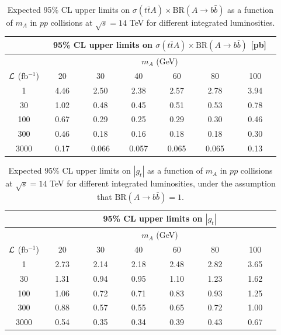 \documentclass[preprintnumbers,superscriptaddress,nofootinbib,aps,prd,floatfix]{revtex4}
\newcommand{\ttbar}{\ensuremath{t\bar{t}}}
\newcommand{\BR} {\ensuremath{\mathrm{BR}}}
\begin{document}
\begin{table}[h] 
\begin{center} 
\begin{tabular}{ccccccc} 
\hline\hline
 & \multicolumn{6}{c}{95\% CL upper limits on $\sigma(\ttbar A) \times \BR(A\to b\bar{b})$ [pb]} \\
\hline
  & \multicolumn{6}{c}{$m_A$ (GeV)} \\
  \cline{2-7} 
${\cal L}$ (fb$^{-1}$) & $\quad$ 20 $\quad$ & $\quad$ 30 $\quad$ & $\quad$ 40 $\quad$ & $\quad$ 60 $\quad$ & $\quad$ 80 $\quad$ & $\quad$ 100 $\quad$ \\
\hline
1 & 4.46 & 2.50 & 2.38 & 2.57 & 2.78 & 3.94 \\
30 & 1.02 & 0.48 & 0.45 & 0.51 & 0.53 & 0.78  \\
100 & 0.67 & 0.29 & 0.25 & 0.29 & 0.30 & 0.46 \\
300 & 0.46 & 0.18 & 0.16 & 0.18 & 0.18 & 0.30 \\
3000 & 0.17 & 0.066 & 0.057 & 0.065 & 0.065 & 0.13 \\
\hline\hline
\end{tabular} 
\caption{\small {Expected 95\% CL upper limits on $\sigma(\ttbar A) \times \BR(A\to b\bar{b})$ as a function of $m_A$ 
in $pp$ collisions at $\sqrt{s}=14$ TeV for different integrated luminosities.}}
\label{tab:sigma_95CL} 
\end{center} 
\end{table} 

\begin{table}[h!] 
\begin{center} 
\begin{tabular}{ccccccc} 
\hline\hline
 & \multicolumn{6}{c}{95\% CL upper limits on $|g_t|$} \\
\hline
  & \multicolumn{6}{c}{$m_A$ (GeV)} \\
  \cline{2-7} 
${\cal L}$ (fb$^{-1}$) & $\quad$ 20 $\quad$ & $\quad$ 30 $\quad$ & $\quad$ 40 $\quad$ & $\quad$ 60 $\quad$ & $\quad$ 80 $\quad$ & $\quad$ 100 $\quad$ \\
\hline
1 & 2.73  & 2.14 & 2.18 & 2.48 & 2.82 & 3.65 \\
30 & 1.31  & 0.94 & 0.95 & 1.10 & 1.23 & 1.62 \\
100 & 1.06 & 0.72 & 0.71 & 0.83 & 0.93 & 1.25 \\
300 & 0.88 & 0.57 & 0.55 & 0.65 & 0.72 & 1.00 \\
3000 & 0.54 & 0.35 & 0.34 & 0.39 & 0.43 & 0.67 \\
\hline\hline
\end{tabular} 
\caption{\small {Expected 95\% CL upper limits on $|g_t|$ as a function of $m_A$ 
in $pp$ collisions at $\sqrt{s}=14$ TeV for different integrated luminosities, under the assumption that $\BR(A\to b\bar{b})=1$.}}
\label{tab:ct_95CL} 
\end{center} 
\end{table} 
\end{document}
